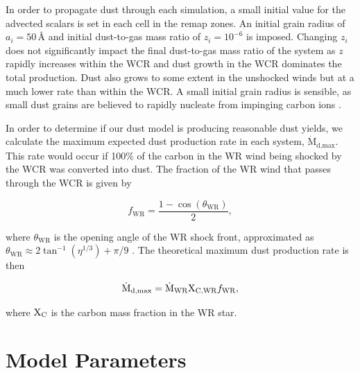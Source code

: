 In order to propagate dust through each simulation, a small initial value for the advected scalars is set in each cell in the remap zones.
An initial grain radius of $a_i = 50 \, \text{\AA}$ and initial dust-to-gas mass ratio of $z_i = 10^{-6}$ is imposed.
Changing $z_i$ does not significantly impact the final dust-to-gas mass ratio of the system as $z$ rapidly increases within the WCR and dust growth in the WCR dominates the total production.
Dust also grows to some extent in the unshocked winds but at a much lower rate than within the WCR.
A small initial grain radius is sensible, as small dust grains are believed to rapidly nucleate from impinging carbon ions 
\parencite{harriesThreedimensionalDustRadiativetransfer2004,zubkoPhysicalModelDust1998a}.

In order to determine if our dust model is producing reasonable dust yields, we calculate the maximum expected dust production rate in each system, $\dot{\text{M}}_\text{d,max}$.
This rate would occur if 100\% of the carbon in the WR wind being shocked by the WCR was converted into dust.
The fraction of the WR wind that passes through the WCR is given by

\begin{equation}
	f_\text{WR} = \frac{1 - \cos \left(\theta_\text{WR}\right)}{2} ,
\end{equation}

\noindent
where $\theta_\text{WR}$ is the opening angle of the WR shock front, approximated as $\theta_\text{WR} \approx 2 \tan^{-1} ( \eta^{1/3} ) + \pi/9$ \parencite{pittardCollidingStellarWinds2018}.
The theoretical maximum dust production rate is then

\begin{equation}
  \label{eq:maxdust}
	\dot{\text{M}}_\text{d,max} = \dot{\text{M}}_\text{WR} \text X_\text{C,WR} f_\text{WR},
\end{equation}

\noindent
where $\text X_\text{C}$ is the carbon mass fraction in the WR star.


\section{Model Parameters}
\label{sec:p1-model-parameters}

